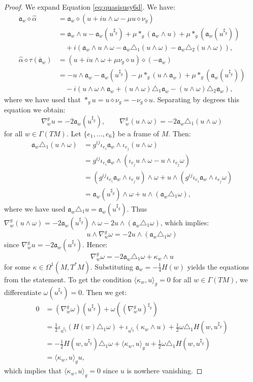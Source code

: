 \documentclass[10pt,a4paper,twoside,reqno]{amsart}
\theoremstyle{plain}
\theoremstyle{definition}
\theoremstyle{remark}
\def\fra{\mathfrak{a}}
\newcommand{\escal}[1]{\langle#1\rangle}
\begin{document}
\begin{proof}
We expand Equation \eqref{eq:quasisusy6d}. We have: 
\begin{align*}
\fra_w\diamond\widehat{\alpha}&=\fra_w\diamond(u+iu\wedge\omega-\mu u\diamond\nu_g)\\
&=\fra_w\wedge u-\fra_w(u^{\sharp_{g}})+\mu*_{g}(\fra_w\wedge u)+\mu*_{g}(\fra_w(u^{\sharp_{g}}))\\
&\quad+i(\fra_w\wedge u\wedge\omega-\fra_w\triangle_1(u\wedge\omega)-\fra_w\triangle_2(u\wedge\omega)),\\
\widehat{\alpha}\diamond\tau(\overline{\fra}_w)&=(u+iu\wedge\omega+\mu\nu_g\diamond u)\diamond(-\fra_w)\\
&=-u\wedge\fra_w-\fra_w(u^{\sharp_{g}})-\mu*_{g}(u\wedge\fra_w)+\mu*_{g}(\fra_w(u^{\sharp_{g}}))\\
&\quad-i(u\wedge\omega\wedge\fra_w+(u\wedge\omega)\triangle_1\fra_w-(u\wedge\omega)\triangle_2\fra_w),
\end{align*} 
where we have used that $*_{g}u=u\diamond\nu_g=-\nu_g\diamond u$. Separating by degrees this equation we obtain: $$\nabla^g_wu=-2\fra_w(u^{\sharp_{g}}),\qquad \nabla^g_w(u\wedge\omega)=-2\fra_w\triangle_1(u\wedge\omega)$$ for all $w\in\Gamma(TM)$. Let $\{e_1,\ldots,e_6\}$ be a frame of $M$. Then: 
\begin{align*}
        \fra_w\triangle_1(u\wedge\omega)&=g^{ij}\iota_{e_i}\fra_w\wedge\iota_{e_j}(u\wedge\omega)\\
        &=g^{ij}\iota_{e_i}\fra_w\wedge(\iota_{e_j}u\wedge\omega-u\wedge\iota_{e_j}\omega)\\
        &=(g^{ij}\iota_{e_i}\fra_w\wedge\iota_{e_j}u)\wedge\omega+u\wedge(g^{ij}\iota_{e_i}\fra_w\wedge\iota_{e_j}\omega)\\
        &=\fra_w(u^{\sharp_g})\wedge\omega+u\wedge(\fra_w\triangle_1\omega),
    \end{align*} where we have used $\fra_w\triangle_1u=\fra_w(u^{\sharp_g})$. Thus $\nabla^g_w(u\wedge\omega)=-2\fra_w(u^{\sharp_g})\wedge\omega-2u\wedge(\fra_w\triangle_1\omega)$, which implies: $$u\wedge\nabla^g_w\omega=-2u\wedge(\fra_w\triangle_1\omega)$$ since $\nabla^g_wu=-2\fra_w(u^{\sharp_{g}})$. Hence: $$\nabla^g_w\omega=-2\fra_w\triangle_1\omega+\kappa_w\wedge u$$ for some $\kappa\in\Omega^1(M,T^*M)$. Substituting $\fra_w=-\frac{1}{4}H(w)$ yields the equations from the statement. To get the condition $\escal{\kappa_w,u}_g=0$ for all $w\in\Gamma(TM)$, we differentiate $\omega(u^{\sharp_g})=0$. Then we get: \begin{align*}
        0&=(\nabla^g_w\omega)(u^{\sharp_g})+\omega((\nabla^g_wu)^{\sharp_g})\\
        &=\frac{1}{2}\iota_{u^{\sharp_g}}(H(w)\triangle_1\omega)+\iota_{u^{\sharp_g}}(\kappa_w\wedge u)+\frac{1}{2}\omega\triangle_1H(w,u^{\sharp_g})\\
        &=-\frac{1}{2}H(w,u^{\sharp_g})\triangle_1\omega+\escal{\kappa_w,u}_gu+\frac{1}{2}\omega\triangle_1H(w,u^{\sharp_g})\\
        &=\escal{\kappa_w,u}_gu,
    \end{align*} which implies that $\escal{\kappa_w,u}_g=0$ since $u$ is nowhere vanishing.
\end{proof}
\end{document}
